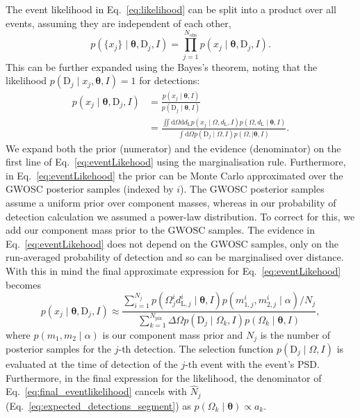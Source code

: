 \documentclass[usenatbib,useAMS]{mnras}
\newcommand{\Nobs}{\ensuremath{N_\mathrm{obs}}}
\newcommand{\Npix}{\ensuremath{N_\mathrm{pix}}}
\newcommand{\dL}{\ensuremath{d_\mathrm{L}}}
\begin{document}
The event likelihood in Eq.~\eqref{eq:likelihood} can be split into a product
over all events, assuming they are independent of each other,
\begin{equation}\nonumber
		p\left(\{x_{j}\} \mid \bm{\theta}, \bm{\mathrm{D}}_j,I \right)
		=
		\prod_{j=1}^{\Nobs}
		p\left(x_{j} \mid \bm{\theta}, \bm{\mathrm{D}}_j,I \right).
\end{equation}
% 
This can be further expanded using the Bayes's theorem, noting that the
likelihood $p\left(\bm{\mathrm{D}}_{j} \mid x_j, \bm{\theta}, I\right) = 1$ for
detections:
%
\begin{equation}\label{eq:eventLikehood}
    \begin{split}
    p\left(x_{j} \mid \bm{\theta},\bm{\mathrm{D}}_j, I\right)
	&=
	\frac{p\left(x_{j} \mid \bm{\theta}, I\right)} {p\left(\bm{\mathrm{D}}_{j} \mid \bm{\theta},I \right)}\\
	&=
	\frac{\iint \mathrm{d}\Omega \mathrm{d}\dL
	p\left(x_j \mid \Omega, \dL, I\right)
	p\left(\Omega, \dL \mid \bm{\theta}, I\right)}
	{\int \mathrm{d}\Omega
	p\left(\bm{\mathrm{D}}_j \mid \Omega, I\right)
        p\left(\Omega, \mid \bm{\theta}, I\right)}.
    \end{split}
\end{equation}
We expand both the prior (numerator) and the evidence (denominator) on the
first line of Eq.~\eqref{eq:eventLikehood} using the marginalisation rule.
Furthermore, in Eq.~\eqref{eq:eventLikehood} the prior can be Monte Carlo
approximated over the GWOSC posterior samples (indexed by $i$). The GWOSC
posterior samples assume a uniform prior over component masses, whereas in our
probability of detection calculation we assumed a power-law distribution.
To correct for this, we add our component mass prior to the GWOSC samples. The
evidence in Eq.~\eqref{eq:eventLikehood} does not depend on the GWOSC samples,
only on the run-averaged probability of detection and so can be marginalised
over distance. With this in mind the final approximate expression for
Eq.~\eqref{eq:eventLikehood} becomes
%
\begin{equation}\label{eq:final_eventlikelihood}
    p\left(x_{j} \mid \bm{\theta},\bm{\mathrm{D}}_j, I\right)
    \approx
    \frac
    {\sum_{i=1}^{N_j}
    p\left(\Omega_{j}^{i} d_{\mathrm{L}, j}^{i} \mid \bm{\theta}, I\right)
    p\left(m_{1, j}^{i}, m_{2, j}^{i} \mid \alpha \right)/N_j
    }
    {
    \sum_{k=1}^{\Npix} \Delta \Omega
    p\left(\bm{\mathrm{D}}_j \mid \Omega_k, I\right)
    p\left(\Omega_k \mid \bm{\theta}, I\right)
    },
\end{equation}
% 
where $p\left(m_1, m_2 \mid \alpha\right)$ is our component mass
prior and $N_j$ is the number of posterior samples for the $j$-th detection.
The selection function $p(\bm{\mathrm{D}}_{j} \mid \Omega,I)$ is evaluated at
the time of detection of the $j$-th event with the event's \ac{PSD}.
Furthermore, in the final expression for the likelihood, the denominator of
Eq.~\eqref{eq:final_eventlikelihood} cancels with $\hat{N}_j$
(Eq.~\ref{eq:expected_detections_segment}) as
$p\left(\Omega_k \mid \bm{\theta}\right) \propto a_k$.
\end{document}
